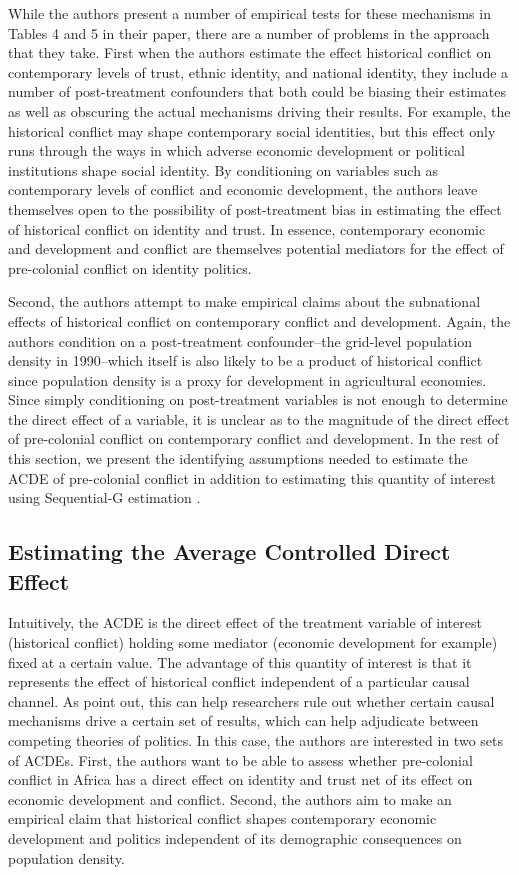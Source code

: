 While the authors present a number of empirical tests for these mechanisms in Tables 4 and 5 in their paper, there are a number of problems in the approach that they take. First when the authors estimate the effect historical conflict on contemporary levels of trust, ethnic identity, and national identity, they include a number of post-treatment confounders that both could be biasing their estimates as well as obscuring the actual mechanisms driving their results. For example, the historical conflict may shape contemporary social identities, but this effect only runs through the ways in which adverse economic development or political institutions shape social identity. By conditioning on variables such as contemporary levels of conflict and economic development, the authors leave themselves open to the possibility of post-treatment bias in estimating the effect of historical conflict on identity and trust. In essence, contemporary economic and development and conflict are themselves potential mediators for the effect of pre-colonial conflict on identity politics.

Second, the authors attempt to make empirical claims about the subnational effects of historical conflict on contemporary conflict and development. Again, the authors condition on a post-treatment confounder--the grid-level population density in 1990--which itself is also likely to be a product of historical conflict since population density is a proxy for development in agricultural economies. Since simply conditioning on post-treatment variables is not enough to determine the direct effect of a variable, it is unclear as to the magnitude of the direct effect of pre-colonial conflict on contemporary conflict and development. In the rest of this section, we present the identifying assumptions needed to estimate the ACDE of pre-colonial conflict in addition to estimating this quantity of interest using Sequential-G estimation \citep{JoffeGreene2009,Vansteelandt2009,AcharyaBlackwellSen2016}. 


\subsection{Estimating the Average Controlled Direct Effect}

Intuitively, the ACDE is the direct effect of the treatment variable of interest (historical conflict) holding some mediator (economic development for example) fixed at a certain value. The advantage of this quantity of interest is that it represents the effect of historical conflict independent of a particular causal channel. As \citet{AcharyaBlackwellSen2016} point out, this can help researchers rule out whether certain causal mechanisms drive a certain set of results, which can help adjudicate between competing theories of politics. In this case, the authors are interested in two sets of ACDEs. First, the authors want to be able to assess whether pre-colonial conflict in Africa has a direct effect on identity and trust net of its effect on economic development and conflict. Second, the authors aim to make an empirical claim that historical conflict shapes contemporary economic development and politics independent of its demographic consequences on population density.

